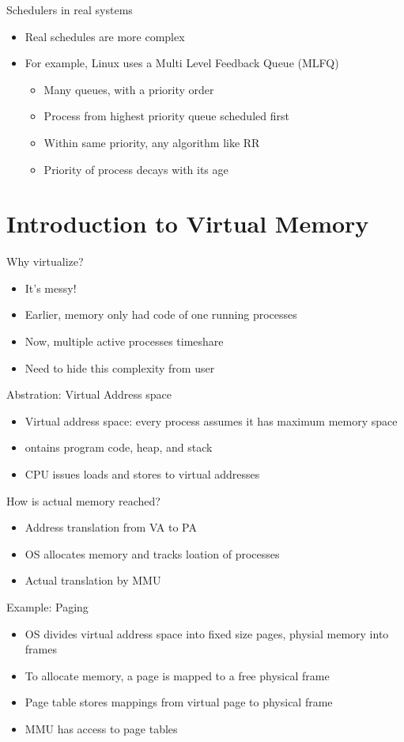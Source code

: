 \documentclass[12pt]{article}
\begin{document}
Schedulers in real systems
\begin{itemize}
    \item Real schedules are more complex
    \item For example, Linux uses a Multi Level Feedback Queue (MLFQ)
    \begin{itemize}
        \item Many queues, with a priority order
        \item Process from highest priority queue scheduled first
        \item Within same priority, any algorithm like RR
        \item Priority of process decays with its age
    \end{itemize}
\end{itemize}
\newpage
\section{Introduction to Virtual Memory}

Why virtualize?
\begin{itemize}
    \item It's messy!
    \item Earlier, memory only had code of one running processes
    \item Now, multiple active processes timeshare
    \item Need to hide this complexity from user
\end{itemize}

Abstration: Virtual Address space
\begin{itemize}
    \item Virtual address space: every process assumes it has maximum memory space
    \item ontains program code, heap, and stack
    \item CPU issues loads and stores to virtual addresses
\end{itemize}

How is actual memory reached?
\begin{itemize}
    \item Address translation from VA to PA
    \item OS allocates memory and tracks loation of processes
    \item Actual translation by MMU
\end{itemize}

Example: Paging
\begin{itemize}
    \item OS divides virtual address space into fixed size pages, physial memory into frames
    \item To allocate memory, a page is mapped to a free physical frame
    \item Page table stores mappings from virtual page to physical frame
    \item MMU has access to page tables
\end{itemize}
\end{document}
